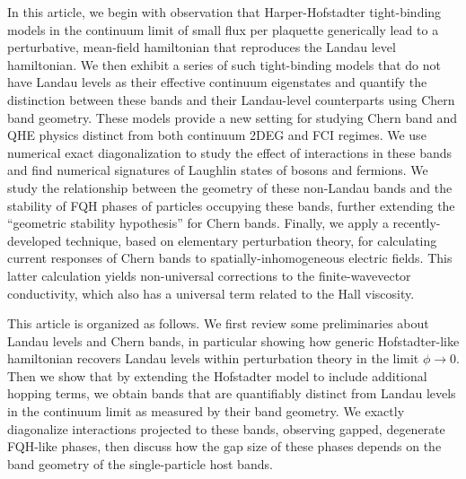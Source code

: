 \documentclass[aps,prb,twocolumn,letterpaper,twoside,nobalancelastpage,groupedaddress,amsmath,amssymb,floatfix,citeautoscript]{revtex4-1}
\begin{document}
In this article, we begin with observation that Harper-Hofstadter \cite{harper_general_1955,Azbel:1964tk,hofstadter_energy_1976} tight-binding models in the continuum limit of small flux per plaquette generically lead to a perturbative, mean-field hamiltonian that reproduces the Landau level hamiltonian. We then exhibit a series of such tight-binding models that do not have Landau levels as their effective continuum eigenstates and quantify the distinction between these bands and their Landau-level counterparts using Chern band geometry. These models provide a new setting for studying Chern band and QHE physics distinct from both continuum 2DEG and FCI regimes. We use numerical exact diagonalization to study the effect of interactions in these bands and find numerical signatures of Laughlin states of bosons and fermions. We study the relationship between the geometry of these non-Landau bands and the stability of FQH phases of particles occupying these bands, further extending the ``geometric stability hypothesis'' for Chern bands\cite{jackson_geometric_2015}. Finally, we apply a recently-developed technique, based on elementary perturbation theory\cite{harper_finite-wavevector_2018}, for calculating current responses of Chern bands to spatially-inhomogeneous electric fields. This latter calculation yields non-universal corrections to the finite-wavevector conductivity, which also has a universal term related to the Hall viscosity.

This article is organized as follows. We first review some preliminaries about Landau levels and Chern bands, in particular showing how generic Hofstadter-like hamiltonian recovers Landau levels within perturbation theory in the limit $\phi\rightarrow 0$. Then we show that by extending the Hofstadter model to include additional hopping terms, we obtain bands that are quantifiably distinct from Landau levels in the continuum limit as measured by their band geometry. We exactly diagonalize interactions projected to these bands, observing gapped, degenerate FQH-like phases, then discuss how the gap size of these phases depends on the band geometry of the single-particle host bands. 
\end{document}
